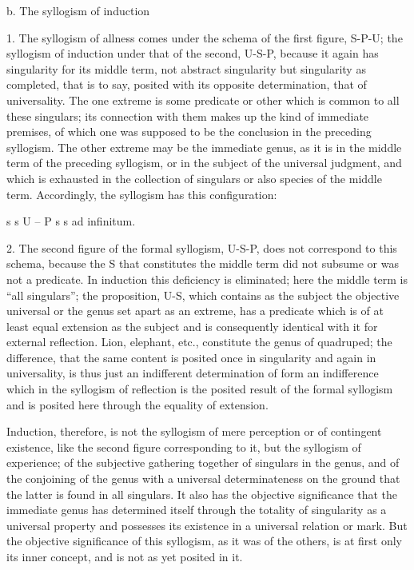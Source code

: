 b. The syllogism of induction

1. The syllogism of allness comes under
the schema of the first figure, S-P-U;
the syllogism of induction under that of the second, U-S-P,
because it again has singularity for its middle term,
not abstract singularity but singularity as completed,
that is to say, posited with its opposite determination,
that of universality.
The one extreme is some predicate or other
which is common to all these singulars;
its connection with them makes up
the kind of immediate premises,
of which one was supposed to be the conclusion
in the preceding syllogism.
The other extreme may be the immediate genus,
as it is in the middle term of the preceding syllogism,
or in the subject of the universal judgment,
and which is exhausted in the collection of
singulars or also species of the middle term.
Accordingly, the syllogism has this configuration:

s
s
U -- P
s
s
ad
infinitum.

2. The second figure of the formal syllogism, U-S-P,
does not correspond to this schema,
because the S that constitutes the middle term
did not subsume or was not a predicate.
In induction this deficiency is eliminated;
here the middle term is “all singulars”;
the proposition, U-S, which contains
as the subject the objective universal
or the genus set apart as an extreme,
has a predicate which is
of at least equal extension  as the subject
and is consequently identical with it for external reflection.
Lion, elephant, etc., constitute the genus of quadruped;
the difference, that the same content is posited
once in singularity and again in universality,
is thus just an indifferent determination of form
an indifference which in the syllogism of reflection is
the posited result of the formal syllogism
and is posited here through the equality of extension.

Induction, therefore, is not the syllogism
of mere perception or of contingent existence,
like the second figure corresponding to it,
but the syllogism of experience;
of the subjective gathering together of singulars in the genus,
and of the conjoining of the genus with a universal determinateness on
the ground that the latter is found in all singulars.
It also has the objective significance
that the immediate genus has determined itself
through the totality of singularity as
a universal property and possesses its existence
in a universal relation or mark.
But the objective significance of this syllogism,
as it was of the others, is at first
only its inner concept,
and is not as yet posited in it.

